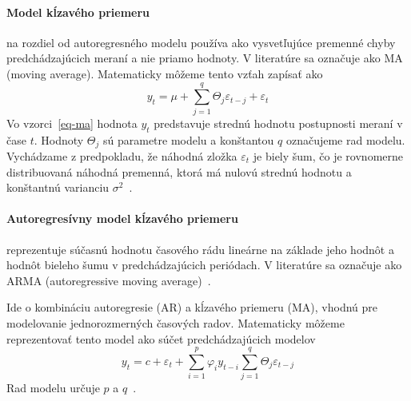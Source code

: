 \documentclass[a4paper,slovak,12pt,appendix]{article}
\begin{document}
\paragraph{Model kĺzavého priemeru} na rozdiel od autoregresného modelu používa
ako vysvetľujúce premenné chyby predchádzajúcich meraní a nie priamo hodnoty.
V literatúre sa označuje ako MA (moving average). Matematicky môžeme tento
vzťah zapísať ako
\begin{equation}
  y_t = \mu + \sum_{j=1}^{q} \Theta_j \varepsilon_{t-j} + \varepsilon_t
  \label{eq-ma}
\end{equation}
Vo vzorci~\ref{eq-ma} hodnota $y_t$ predstavuje strednú hodnotu
postupnosti meraní v čase $t$. Hodnoty $\Theta_j$ sú parametre modelu
a konštantou $q$ označujeme rad modelu. Vychádzame z predpokladu, že náhodná
zložka $\varepsilon_t$ je biely šum, čo je rovnomerne distribuovaná náhodná
premenná, ktorá má nulovú strednú hodnotu a konštantnú varianciu
$\sigma^2$~\cite{Agrawal2013}.

\paragraph{Autoregresívny model kĺzavého priemeru} reprezentuje súčasnú hodnotu
časového rádu lineárne na základe jeho hodnôt a hodnôt bieleho šumu
v predchádzajúcich periódach. V literatúre sa označuje ako ARMA (autoregressive
moving average)~\cite{KumarSingh2013}.

Ide o kombináciu autoregresie (AR) a kĺzavého priemeru (MA), vhodnú pre
modelovanie jednorozmerných časových radov. Matematicky môžeme reprezentovať
tento model ako súčet predchádzajúcich modelov
\begin{equation}
  y_t = c + \varepsilon_t + \sum_{i=1}^{p} \varphi_i y_{t-i}  \sum_{j=1}^{q} \Theta_j \varepsilon_{t-j}
  \label{eq-arma}
\end{equation}
Rad modelu určuje $p$ a $q$~\cite{Agrawal2013}.
\end{document}
